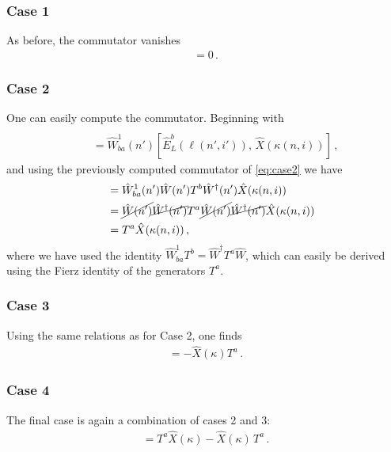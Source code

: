 \documentclass[reprint,superscriptaddress,pra,nofootinbib,preprintnumbers,floatfix]{revtex4-1}
\begin{document}
\subsubsection*{Case 1}
As before, the commutator vanishes
%
\begin{align}
    [\hat{\mathcal{J}}^a(\ell), \hat X(\kappa)] = 0
    \,.
\end{align}

\subsubsection*{Case 2}
One can easily compute the commutator. Beginning with
\begin{align}
    [ &\hat{\mathcal{J}}^a(\ell(n',i')), \, \hat X(\kappa(n,i))] \nonumber\\
    & \quad =  \hat{W}^1_{ba}(n') [ \hat{E}^b_{L}(\ell(n',i')),\, \hat X(\kappa(n,i))]\,,
\end{align}
and using the previously computed commutator of \cref{eq:case2} we have
\begin{align}
    & \quad =  \hat{W}^1_{ba}(n') \hat W(n') T^b \hat W^\dagger(n') \hat X(\kappa(n,i)) \nonumber\\
    & \quad = \cancel{ \hat W(n') }  \cancel{ \hat W^\dagger(n') } T^a \cancel{ \hat W(n') } \cancel{ \hat W^\dagger(n') } \hat X(\kappa(n,i)) \nonumber\\
    & \quad = T^a \hat X(\kappa(n,i)) \,,
\end{align}
where we have used the identity $\hat W^{1}_{ba} T^b = \hat W^\dagger T^a \hat W$, which can easily be derived using the Fierz identity of the generators $T^a$. 

\subsubsection*{Case 3}
Using the same relations as for Case 2, one finds
\begin{align}
    [\mathcal{J}^a(\ell), \hat X(\kappa)] = -\hat X(\kappa)T^a
    \,.
\end{align}

\subsubsection*{Case 4}
The final case is again a combination of cases 2 and 3:
\begin{align}
    [\hat{\mathcal{J}}^a(\ell), \hat X(\kappa)] = T^a \hat X(\kappa)-\hat X(\kappa)\,T^a
    \,.
\end{align}
\end{document}
